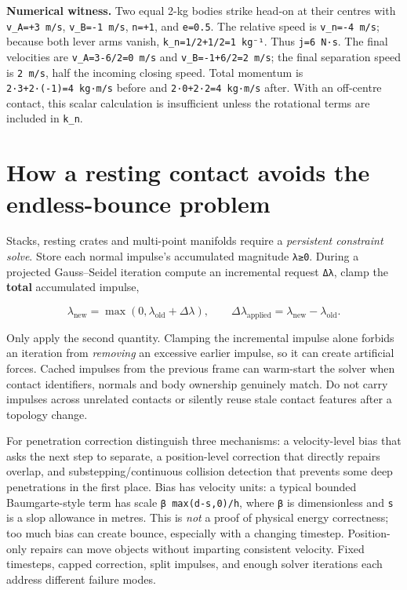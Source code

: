 \textbf{Numerical witness.} Two equal 2-kg bodies strike head-on at their centres with \texttt{v\_A=+3\ m/s}, \texttt{v\_B=-1\ m/s}, \texttt{n=+1}, and \texttt{e=0.5}. The relative speed is \texttt{v\_n=-4\ m/s}; because both lever arms vanish, \texttt{k\_n=1/2+1/2=1\ kg⁻¹}. Thus \texttt{j=6\ N·s}. The final velocities are \texttt{v\textquotesingle{}\_A=3-6/2=0\ m/s} and \texttt{v\textquotesingle{}\_B=-1+6/2=2\ m/s}; the final separation speed is \texttt{2\ m/s}, half the incoming closing speed. Total momentum is \texttt{2·3+2·(-1)=4\ kg·m/s} before and \texttt{2·0+2·2=4\ kg·m/s} after. With an off-centre contact, this scalar calculation is insufficient unless the rotational terms are included in \texttt{k\_n}.

\section{How a resting contact avoids the endless-bounce problem}\label{06-engine-ii-ch033-how-a-resting-contact-avoids-the-endless-bounce-problem}

Stacks, resting crates and multi-point manifolds require a \emph{persistent constraint solve}. Store each normal impulse's accumulated magnitude \texttt{λ≥0}. During a projected Gauss--Seidel iteration compute an incremental request \texttt{Δλ}, clamp the \textbf{total} accumulated impulse,

\[
\lambda_{\mathrm{new}}=\max(0,\lambda_{\mathrm{old}}+\Delta\lambda),\qquad
\Delta\lambda_{\mathrm{applied}}=\lambda_{\mathrm{new}}-\lambda_{\mathrm{old}}.
\]

Only apply the second quantity. Clamping the incremental impulse alone forbids an iteration from \emph{removing} an excessive earlier impulse, so it can create artificial forces. Cached impulses from the previous frame can warm-start the solver when contact identifiers, normals and body ownership genuinely match. Do not carry impulses across unrelated contacts or silently reuse stale contact features after a topology change.

For penetration correction distinguish three mechanisms: a velocity-level bias that asks the next step to separate, a position-level correction that directly repairs overlap, and substepping/continuous collision detection that prevents some deep penetrations in the first place. Bias has velocity units: a typical bounded Baumgarte-style term has scale \texttt{β\ max(d-s,0)/h}, where \texttt{β} is dimensionless and \texttt{s} is a slop allowance in metres. This is \emph{not} a proof of physical energy correctness; too much bias can create bounce, especially with a changing timestep. Position-only repairs can move objects without imparting consistent velocity. Fixed timesteps, capped correction, split impulses, and enough solver iterations each address different failure modes.

